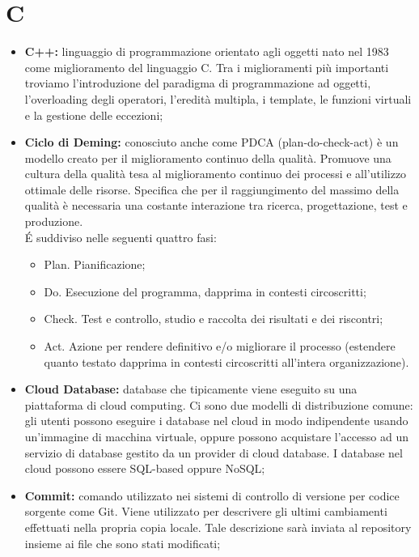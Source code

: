 \section*{C} %
\label{sec:c}
	\begin{itemize}
		\item \textbf{C++:} linguaggio di programmazione orientato agli oggetti nato nel 1983 come miglioramento del linguaggio C. Tra i miglioramenti più importanti troviamo l'introduzione del paradigma di programmazione ad oggetti, l'overloading degli operatori, l'eredità multipla, i template, le funzioni virtuali e la gestione delle eccezioni;
		\item \textbf{Ciclo di Deming:} conosciuto anche come PDCA (plan-do-check-act) è un modello creato per il miglioramento continuo della qualità. Promuove una cultura della qualità tesa al miglioramento continuo dei processi e all'utilizzo ottimale delle risorse. Specifica che per il raggiungimento del massimo della qualità è necessaria una costante interazione tra ricerca, progettazione, test e produzione.\\
		É suddiviso nelle seguenti quattro fasi:
			\begin{itemize}
				\item Plan. Pianificazione;
				\item Do. Esecuzione del programma, dapprima in contesti circoscritti;
				\item Check. Test e controllo, studio e raccolta dei risultati e dei riscontri;
				\item Act. Azione per rendere definitivo e/o migliorare il processo (estendere quanto testato dapprima in contesti circoscritti all'intera organizzazione).
			\end{itemize}
		\item \textbf{Cloud Database:} database che tipicamente viene eseguito su una piattaforma di cloud computing. Ci sono due modelli di distribuzione comune: gli utenti possono eseguire i database nel cloud in modo indipendente usando un'immagine di macchina virtuale, oppure possono acquistare l'accesso ad un servizio di database gestito da un provider di cloud database. I database nel cloud possono essere SQL-based oppure NoSQL;
		\item \textbf{Commit:} comando utilizzato nei sistemi di controllo di versione per codice sorgente come Git. Viene utilizzato per descrivere gli ultimi cambiamenti effettuati nella propria copia locale. Tale descrizione sarà inviata al repository insieme ai file che sono stati modificati;

\end{itemize}
